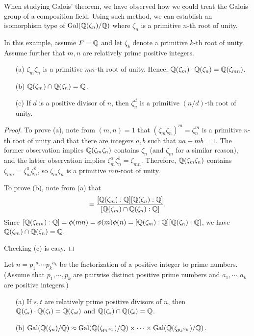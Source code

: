 When studying Galois' theorem, we have observed how we could treat the Galois group of a composition field.
Using such method, we can establish an isomorphism type of ${\textrm{Gal}({{\mathbb{Q}}(\zeta_n)/{\mathbb{Q}}})}$ where $\zeta_n$ is a primitive $n$-th root of unity.
\begin{obs}
    In this example, assume $F={\mathbb{Q}}$ and let $\zeta_k$ denote a primitive $k$-th root of unity.
    Assume further that $m, n$ are relatively prime positive integers.
    \begin{enumerate}
        \item[(a)]
        {
            $\zeta_m\zeta_n$ is a primitive $mn$-th root of unity.
            Hence, ${\mathbb{Q}}(\zeta_m)\cdot{\mathbb{Q}}(\zeta_n)={\mathbb{Q}}(\zeta_{mn})$.
        }
        \item[(b)]
        {
            ${\mathbb{Q}}(\zeta_m)\cap{\mathbb{Q}}(\zeta_n)={\mathbb{Q}}$.
        }
        \item[(c)]
        {
            If $d$ is a positive divisor of $n$, then $\zeta_n^d$ is a primitive $(n/d)$-th root of unity.
        }
    \end{enumerate}
\end{obs}
\begin{proof}
    To prove (a), note from $(m, n)=1$ that $(\zeta_m\zeta_n)^m=\zeta_n^m$ is a primitive $n$-th root of unity and that there are integers $a, b$ such that $na+mb=1$.
    The former observation implies ${\mathbb{Q}}(\zeta_m\zeta_n)$ contains $\zeta_n$ (and $\zeta_m$ for a similar reason), and the latter observation implies $\zeta_m^a\zeta_n^b=\zeta_{mn}$.
    Therefore, ${\mathbb{Q}}(\zeta_m\zeta_n)$ contains $\zeta_{mn}=\zeta_m^a\zeta_n^b$, so $\zeta_m\zeta_n$ is a primitive $mn$-root of unity.

    To prove (b), note from (a) that
    \begin{align*}
        [\bb{Q}(\zeta_{mn}):\bb{Q}]=\frac{[\bb{Q}(\zeta_m):\bb{Q}][\bb{Q}(\zeta_n):\bb{Q}]}{[\bb{Q}(\zeta_m)\cap\bb{Q}(\zeta_n): \bb{Q}]}.
    \end{align*}
    Since $[{\mathbb{Q}}(\zeta_{mn}):{\mathbb{Q}}]=\phi(mn)=\phi(m)\phi(n)=[{\mathbb{Q}}(\zeta_m):{\mathbb{Q}}][{\mathbb{Q}}(\zeta_n):{\mathbb{Q}}]$, we have ${\mathbb{Q}}(\zeta_m)\cap{\mathbb{Q}}(\zeta_n)={\mathbb{Q}}$.

    Checking (c) is easy.
\end{proof}
\begin{prop}
    Let $n={p_1}^{a_1}\cdots{p_k}^{a_k}$ be the factorization of a positive integer to prime numbers. (Assume that $p_1, \cdots, p_k$ are pairwise distinct positive prime numbers and $a_1, \cdots, a_k$ are positive integers.)
    \begin{enumerate}
        \item[(a)]
        {
            If $s, t$ are relatively prime positive divisors of $n$, then ${\mathbb{Q}}(\zeta_s)\cdot{\mathbb{Q}}(\zeta_t)={\mathbb{Q}}(\zeta_{st})$ and ${\mathbb{Q}}(\zeta_s)\cap{\mathbb{Q}}(\zeta_t)={\mathbb{Q}}$.
        }
        \item[(b)]
        {
            ${\textrm{Gal}({{\mathbb{Q}}(\zeta_n)/{\mathbb{Q}}})}\approx{\textrm{Gal}({{\mathbb{Q}}(\zeta_{{p_1}^{a_1}})/{\mathbb{Q}}})}\times\cdots\times{\textrm{Gal}({{\mathbb{Q}}(\zeta_{{p_k}^{a_k}})/{\mathbb{Q}}})}$.
        }
    \end{enumerate}
\end{prop}
